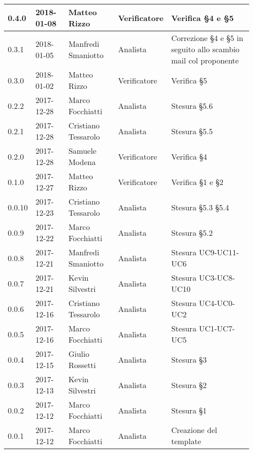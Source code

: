 \documentclass[./AnalisideiRequisiti.tex]{subfiles}
\begin{document}
{\begin{longtable}{|p{20mm}|p{20mm}|p{40mm}|p{30mm}|p{50mm}|}
		0.4.0 & 2018-01-08 & Matteo Rizzo & Verificatore & Verifica §4 e §5\\ \hline
		0.3.1 & 2018-01-05 & Manfredi Smaniotto & Analista & Correzione §4 e §5 in seguito allo scambio mail col proponente \\ \hline		
		0.3.0 & 2018-01-02 & Matteo Rizzo & Verificatore & Verifica §5\\ \hline
		0.2.2 & 2017-12-28 & Marco Focchiatti & Analista & Stesura §5.6\\ \hline	
		0.2.1 & 2017-12-28 & Cristiano Tessarolo & Analista & Stesura §5.5\\ \hline
	   	0.2.0 & 2017-12-28 & Samuele Modena & Verificatore & Verifica §4\\ \hline
	   	0.1.0 & 2017-12-27 & Matteo Rizzo & Verificatore & Verifica §1 e §2  \\ \hline		
		0.0.10 & 2017-12-23 & Cristiano Tessarolo & Analista & Stesura §5.3 §5.4\\ \hline		
		0.0.9 & 2017-12-22 & Marco Focchiatti & Analista & Stesura §5.2 \\ \hline		
		0.0.8 & 2017-12-21 & Manfredi Smaniotto & Analista & Stesura UC9-UC11-UC6\\ \hline
		0.0.7 & 2017-12-21 & Kevin Silvestri & Analista & Stesura UC3-UC8-UC10\\ \hline
		0.0.6 & 2017-12-16 & Cristiano Tessarolo & Analista & Stesura UC4-UC0-UC2\\ \hline
		0.0.5 & 2017-12-16 & Marco Focchiatti & Analista & Stesura UC1-UC7-UC5\\ \hline
		0.0.4 & 2017-12-15 & Giulio Rossetti & Analista & Stesura §3\\ \hline
		0.0.3 & 2017-12-13 & Kevin Silvestri & Analista & Stesura §2\\ \hline
		0.0.2 & 2017-12-12 & Marco Focchiatti & Analista & Stesura §1\\ \hline
		0.0.1 & 2017-12-12 & Marco Focchiatti & Analista & Creazione del template\\ \hline
	\end{longtable}

}	
\end{document}
